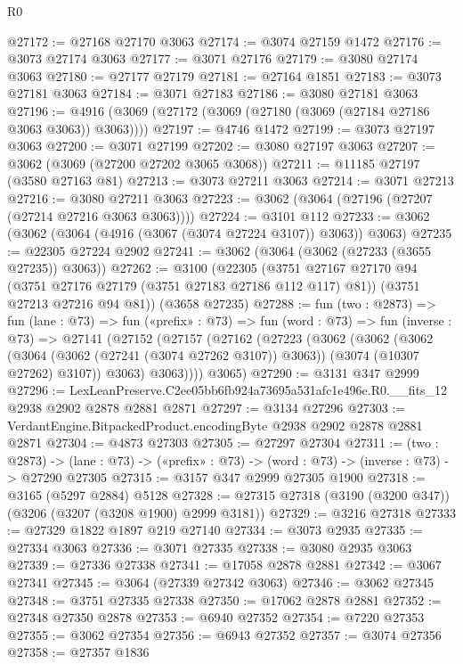 \begin{lexlean}{R0}
\begin{coremodule}
@27172 := @27168 @27170 @3063
@27174 := @3074 @27159 @1472
@27176 := @3073 @27174 @3063
@27177 := @3071 @27176
@27179 := @3080 @27174 @3063
@27180 := @27177 @27179
@27181 := @27164 @1851
@27183 := @3073 @27181 @3063
@27184 := @3071 @27183
@27186 := @3080 @27181 @3063
@27196 := @4916 (@3069 (@27172 (@3069 (@27180 (@3069 (@27184 @27186 @3063 @3063)) @3063))))
@27197 := @4746 @1472
@27199 := @3073 @27197 @3063
@27200 := @3071 @27199
@27202 := @3080 @27197 @3063
@27207 := @3062 (@3069 (@27200 @27202 @3065 @3068))
@27211 := @11185 @27197 (@3580 @27163 @81)
@27213 := @3073 @27211 @3063
@27214 := @3071 @27213
@27216 := @3080 @27211 @3063
@27223 := @3062 (@3064 (@27196 (@27207 (@27214 @27216 @3063 @3063))))
@27224 := @3101 @112
@27233 := @3062 (@3062 (@3064 (@4916 (@3067 (@3074 @27224 @3107)) @3063)) @3063)
@27235 := @22305 @27224 @2902
@27241 := @3062 (@3064 (@3062 (@27233 (@3655 @27235)) @3063))
@27262 := @3100
    (@22305
      (@3751 @27167 @27170 @94 (@3751 @27176 @27179 (@3751 @27183 @27186 @112 @117) @81))
      (@3751 @27213 @27216 @94 @81))
    (@3658 @27235)
@27288 := fun (two : @2873) =>
  fun (lane : @73) =>
  fun («prefix» : @73) =>
  fun (word : @73) =>
  fun (inverse : @73) =>
  @27141
    (@27152
      (@27157
        (@27162
          (@27223
            (@3062
              (@3062
                (@3062
                  (@3064 (@3062 (@27241 (@3074 @27262 @3107)) @3063))
                  (@3074 (@10307 @27262) @3107))
                @3063)
              @3063))))
      @3065)
@27290 := @3131 @347 @2999
@27296 := LexLeanPreserve.C2ee05bb6fb924a73695a531afc1e496e.R0.__fits_12
    @2938
    @2902
    @2878
    @2881
    @2871
@27297 := @3134 @27296
@27303 := VerdantEngine.BitpackedProduct.encodingByte @2938 @2902 @2878 @2881 @2871
@27304 := @4873 @27303
@27305 := @27297 @27304
@27311 := (two : @2873) ->
  (lane : @73) -> («prefix» : @73) -> (word : @73) -> (inverse : @73) -> @27290 @27305
@27315 := @3157 @347 @2999 @27305 @1900
@27318 := @3165 (@5297 @2884) @5128
@27328 := @27315 @27318 (@3190 (@3200 @347)) (@3206 (@3207 (@3208 @1900) @2999 @3181))
@27329 := @3216 @27318
@27333 := @27329 @1822 @1897 @219 @27140
@27334 := @3073 @2935
@27335 := @27334 @3063
@27336 := @3071 @27335
@27338 := @3080 @2935 @3063
@27339 := @27336 @27338
@27341 := @17058 @2878 @2881
@27342 := @3067 @27341
@27345 := @3064 (@27339 @27342 @3063)
@27346 := @3062 @27345
@27348 := @3751 @27335 @27338
@27350 := @17062 @2878 @2881
@27352 := @27348 @27350 @2878
@27353 := @6940 @27352
@27354 := @7220 @27353
@27355 := @3062 @27354
@27356 := @6943 @27352
@27357 := @3074 @27356
@27358 := @27357 @1836

\end{coremodule}
\end{lexlean}
